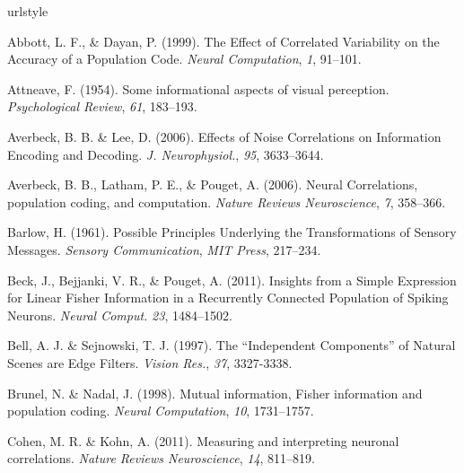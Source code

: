\documentclass[12pt]{article}
\begin{document}
\newpage
\begin{thebibliography}{100}
\providecommand{\natexlab}[1]{#1}
\expandafter\ifx\csname urlstyle\endcsname\relax
  \providecommand{\doi}[1]{doi:\discretionary{}{}{}#1}\else
  \providecommand{\doi}{doi:\discretionary{}{}{}\begingroup
  \urlstyle{rm}\Url}\fi


Abbott, L. F., \& Dayan, P. (1999).
\newblock The Effect of Correlated Variability on the Accuracy of a Population Code.
\newblock \emph{Neural Computation}, \emph{1}, 91--101.

Attneave, F. (1954).
\newblock Some informational aspects of visual perception.
\newblock \emph{Psychological Review}, \emph{61}, 183--193.

Averbeck, B. B. \& Lee, D. (2006).
Effects of Noise Correlations on Information Encoding and Decoding.
\newblock \emph{J. Neurophysiol.}, \emph{95}, 3633--3644.

Averbeck, B. B., Latham, P. E., \& Pouget, A. (2006).
\newblock Neural Correlations, population coding, and computation.
\newblock \emph{Nature Reviews Neuroscience}, \emph{7}, 358--366.

Barlow, H. (1961).
\newblock Possible Principles Underlying the Transformations of Sensory Messages.
\newblock \emph{Sensory Communication}, \emph{MIT Press}, 217--234.

Beck, J., Bejjanki, V. R., \& Pouget, A. (2011).
Insights from a Simple Expression for Linear Fisher Information in a Recurrently Connected Population of Spiking Neurons.
\newblock \emph{Neural Comput.} \emph{23}, 1484--1502.

Bell, A. J. \& Sejnowski, T. J. (1997).
\newblock The ``Independent Components'' of Natural Scenes are Edge Filters.
\newblock \emph{Vision Res.}, \emph{37}, 3327-3338.

Brunel, N. \& Nadal, J. (1998).
\newblock Mutual information, Fisher information and population coding.
\newblock \emph{Neural Computation}, \emph{10}, 1731--1757.

Cohen, M. R. \& Kohn, A. (2011).
\newblock Measuring and interpreting neuronal correlations.
\newblock \emph{Nature Reviews Neuroscience}, \emph{14}, 811--819.


\end{thebibliography}
\end{document}

